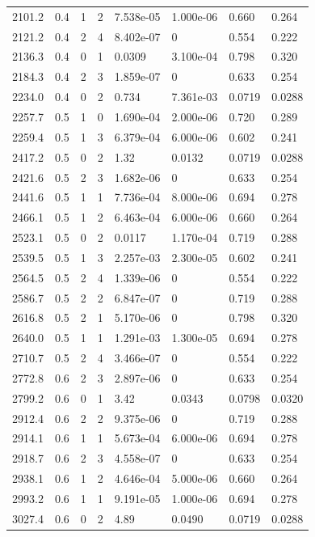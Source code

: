 \documentclass[preview]{standalone}
\begin{document}
{{{\begin{tabular}{L{1.2cm}C{1.2cm} C{0.3cm}C{0.5cm} C{1.4cm}C{1.4cm} C{1.4cm}C{1.4cm}}
  2101.2  &   0.4  & 1     &  2 &  7.538e-05  & 1.000e-06  & 0.660 &  0.264   \\ 
  2121.2  &   0.4  & 2     &  4 &  8.402e-07  & 0  & 0.554 &  0.222   \\ 
  2136.3  &   0.4  & 0     &  1 &  0.0309  & 3.100e-04  & 0.798 &  0.320   \\ 
  2184.3  &   0.4  & 2     &  3 &  1.859e-07  & 0  & 0.633 &  0.254   \\ 
  2234.0  &   0.4  & 0     &  2 &  0.734  & 7.361e-03  & 0.0719 &  0.0288   \\ 
  2257.7  &   0.5  & 1     &  0 &  1.690e-04  & 2.000e-06  & 0.720 &  0.289   \\ 
  2259.4  &   0.5  & 1     &  3 &  6.379e-04  & 6.000e-06  & 0.602 &  0.241   \\ 
  2417.2  &   0.5  & 0     &  2 &  1.32  & 0.0132  & 0.0719 &  0.0288   \\ 
  2421.6  &   0.5  & 2     &  3 &  1.682e-06  & 0  & 0.633 &  0.254   \\ 
  2441.6  &   0.5  & 1     &  1 &  7.736e-04  & 8.000e-06  & 0.694 &  0.278   \\ 
  2466.1  &   0.5  & 1     &  2 &  6.463e-04  & 6.000e-06  & 0.660 &  0.264   \\ 
  2523.1  &   0.5  & 0     &  2 &  0.0117  & 1.170e-04  & 0.719 &  0.288   \\ 
  2539.5  &   0.5  & 1     &  3 &  2.257e-03  & 2.300e-05  & 0.602 &  0.241   \\ 
  2564.5  &   0.5  & 2     &  4 &  1.339e-06  & 0  & 0.554 &  0.222   \\ 
  2586.7  &   0.5  & 2     &  2 &  6.847e-07  & 0  & 0.719 &  0.288   \\ 
  2616.8  &   0.5  & 2     &  1 &  5.170e-06  & 0  & 0.798 &  0.320   \\ 
  2640.0  &   0.5  & 1     &  1 &  1.291e-03  & 1.300e-05  & 0.694 &  0.278   \\ 
  2710.7  &   0.5  & 2     &  4 &  3.466e-07  & 0  & 0.554 &  0.222   \\ 
  2772.8  &   0.6  & 2     &  3 &  2.897e-06  & 0  & 0.633 &  0.254   \\ 
  2799.2  &   0.6  & 0     &  1 &  3.42  & 0.0343  & 0.0798 &  0.0320   \\ 
  2912.4  &   0.6  & 2     &  2 &  9.375e-06  & 0  & 0.719 &  0.288   \\ 
  2914.1  &   0.6  & 1     &  1 &  5.673e-04  & 6.000e-06  & 0.694 &  0.278   \\ 
  2918.7  &   0.6  & 2     &  3 &  4.558e-07  & 0  & 0.633 &  0.254   \\ 
  2938.1  &   0.6  & 1     &  2 &  4.646e-04  & 5.000e-06  & 0.660 &  0.264   \\ 
  2993.2  &   0.6  & 1     &  1 &  9.191e-05  & 1.000e-06  & 0.694 &  0.278   \\ 
  3027.4  &   0.6  & 0     &  2 &  4.89  & 0.0490  & 0.0719 &  0.0288   \\ 
\hline 
\end{tabular} 

}}}
\end{document}
